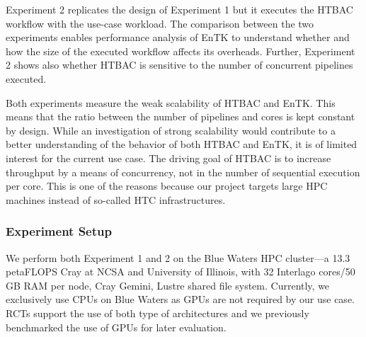 Experiment 2 replicates the design of Experiment 1 but it executes the HTBAC
workflow with the use-case workload. The comparison between the two
experiments enables performance analysis of EnTK to understand whether and
how the size of the executed workflow affects its overheads. Further,
Experiment 2 shows also whether HTBAC is sensitive to the number of
concurrent pipelines executed.


Both experiments measure the weak scalability of HTBAC and EnTK\@. This means
that the ratio between the number of pipelines and cores is kept constant by
design. While an investigation of strong scalability would contribute to a
better understanding of the behavior of both HTBAC and EnTK, it is of limited
interest for the current use case. The driving goal of HTBAC is to increase
throughput by a means of concurrency, not in the number of sequential execution per
core. This is one of the reasons because our project targets large HPC
machines instead of so-called HTC infrastructures.


\subsubsection{Experiment Setup}\label{ssec:exp_setup}

We perform both Experiment 1 and 2 %
on the Blue Waters HPC cluster---a 13.3 petaFLOPS Cray at NCSA and University
of Illinois, with 32 Interlago cores/50 GB RAM per node, Cray Gemini, Lustre
shared file system. Currently, we exclusively use CPUs on Blue Waters as GPUs
are not required by our use case. RCTs support the use of both type of
architectures and we previously benchmarked the use of GPUs for later
evaluation.


